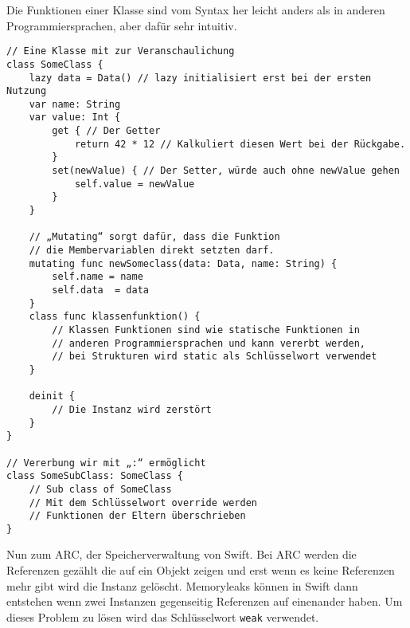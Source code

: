 Die Funktionen einer Klasse sind vom Syntax her leicht anders als in anderen Programmiersprachen, aber dafür sehr intuitiv. 
\begin{lstlisting}
// Eine Klasse mit zur Veranschaulichung 
class SomeClass {
	lazy data = Data() // lazy initialisiert erst bei der ersten Nutzung
	var name: String
	var value: Int {
		get { // Der Getter
			return 42 * 12 // Kalkuliert diesen Wert bei der Rückgabe.
		}
		set(newValue) { // Der Setter, würde auch ohne newValue gehen
			self.value = newValue
		}	
	} 

	// „Mutating“ sorgt dafür, dass die Funktion 
	// die Membervariablen direkt setzten darf.
	mutating func newSomeclass(data: Data, name: String) {
		self.name = name
		self.data  = data
	}
	class func klassenfunktion() {
		// Klassen Funktionen sind wie statische Funktionen in 
		// anderen Programmiersprachen und kann vererbt werden, 
		// bei Strukturen wird static als Schlüsselwort verwendet
	}

	deinit {
		// Die Instanz wird zerstört
	}
}

// Vererbung wir mit „:“ ermöglicht
class SomeSubClass: SomeClass {
	// Sub class of SomeClass
	// Mit dem Schlüsselwort override werden 
	// Funktionen der Eltern überschrieben
}
\end{lstlisting}
Nun zum ARC, der Speicherverwaltung von Swift. Bei ARC werden die Referenzen gezählt die auf ein Objekt zeigen und erst wenn es keine Referenzen mehr gibt wird die Instanz gelöscht. Memoryleaks können in Swift dann entstehen wenn zwei Instanzen gegenseitig Referenzen auf einenander haben. Um dieses Problem zu lösen wird das Schlüsselwort \lstinline{weak} verwendet.
